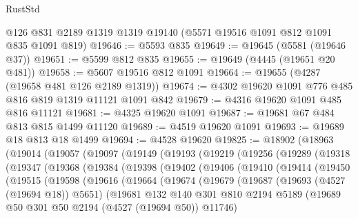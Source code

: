 \begin{lexlean}{RustStd}
\begin{coremodule}
    @126
    @831
    @2189
    @1319
    @1319
    @19140
    (@5571 @19516 @1091 @812 @1091 @835 @1091 @819)
@19646 := @5593 @835
@19649 := @19645 (@5581 (@19646 @37))
@19651 := @5599 @812 @835
@19655 := @19649 (@4445 (@19651 @20 @481))
@19658 := @5607 @19516 @812 @1091
@19664 := @19655 (@4287 (@19658 @481 @126 @2189 @1319))
@19674 := @4302 @19620 @1091 @776 @485 @816 @819 @1319 @11121 @1091 @842
@19679 := @4316 @19620 @1091 @485 @816 @11121
@19681 := @4325 @19620 @1091
@19687 := @19681 @67 @484 @813 @815 @1499 @11120
@19689 := @4519 @19620 @1091
@19693 := @19689 @18 @813 @18 @1499
@19694 := @4528 @19620
@19825 := @18902
    (@18963
      (@19014
        (@19057
          (@19097
            (@19149
              (@19193
                (@19219
                  (@19256
                    (@19289
                      (@19318
                        (@19347
                          (@19368
                            (@19384
                              (@19398
                                (@19402
                                  (@19406
                                    (@19410
                                      (@19414
                                        (@19450
                                          (@19515
                                            (@19598
                                              (@19616
                                                (@19664
                                                  (@19674
                                                    (@19679
                                                      (@19687
                                                        (@19693 (@4527 (@19694 @18)) @5651)
                                                        (@19681
                                                          @132
                                                          @140
                                                          @301
                                                          @810
                                                          @2194
                                                          @5189
                                                          (@19689
                                                            @50
                                                            @301
                                                            @50
                                                            @2194
                                                            (@4527 (@19694 @50))
                                                            @11746)

\end{coremodule}
\end{lexlean}
